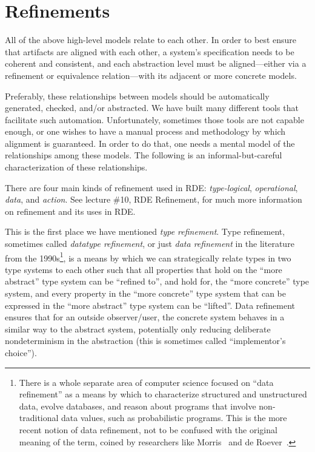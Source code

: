 \documentclass[10pt,letterpaper]{article}
\begin{document}
\section{Refinements}
\label{refinements}

All of the above high-level models relate to each other. In order to best ensure that artifacts are aligned with each other, a system's specification needs to be coherent and consistent, and each abstraction level must be aligned---either via a refinement or equivalence relation---with its adjacent or more concrete models.

Preferably, these relationships between models should be automatically generated, checked, and/or abstracted. We have built many different tools that facilitate such automation. Unfortunately, sometimes those tools are not capable enough, or one wishes to have a manual process and methodology by which alignment is guaranteed. In order to do that, one needs a mental model of the relationships among these models. The following is an informal-but-careful characterization of these relationships.

There are four main kinds of refinement used in RDE: \emph{type-logical}, \emph{operational}, \emph{data}, and \emph{action}. See lecture \#10, RDE Refinement, for much more information on refinement and its uses in RDE.

This is the first place we have mentioned \emph{type refinement}. Type refinement, sometimes called \emph{datatype refinement}, or just \emph{data refinement} in the literature from the 1990s\footnote{There is a whole separate area of computer science focused on ``data refinement'' as a means by which to characterize structured and unstructured data, evolve databases, and reason about programs that involve non-traditional data values, such as probabilistic programs.  This is the more recent notion of data refinement, not to be confused with the original meaning of the term, coined by researchers like Morris~\cite{MorrisLawsData1989} and de Roever~\cite{RoeverEngelhardtDataRefinement2008}.}, is a means by which we can strategically relate types in two type systems to each other such that all properties that hold on the ``more abstract'' type system can be ``refined to'', and hold for, the ``more concrete'' type system, and every property in the ``more concrete'' type system that can be expressed in the ``more abstract'' type system can be ``lifted''. Data refinement ensures that for an outside observer/user, the concrete system behaves in a similar way to the abstract system, potentially only reducing deliberate nondeterminism in the abstraction (this is sometimes called ``implementor's choice'').
\end{document}
